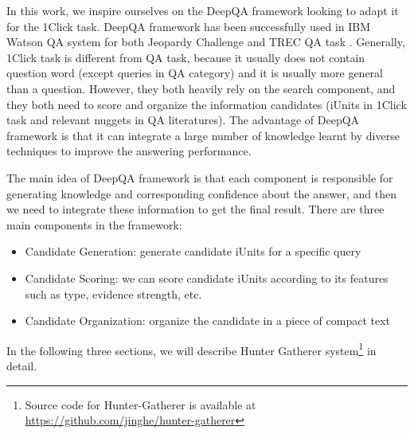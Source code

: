 In this work, we inspire ourselves on the DeepQA framework looking to adapt it for the 1Click task.
DeepQA framework has been successfully used in IBM Watson QA system for both Jeopardy Challenge and TREC QA task \cite{ferrucci_etal_AI10}.
Generally, 1Click task is different from QA task, because it usually does not contain question word (except queries in QA category) and it is usually more general than a question.
However, they both heavily rely on the search component, and they both need to score and organize the information candidates (iUnits in 1Click task and relevant nuggets in QA literatures).
The advantage of DeepQA framework is that it can integrate a large number of knowledge learnt by diverse techniques to improve the answering performance.



The main idea of DeepQA framework is that each component is responsible for generating knowledge and corresponding confidence about the answer, and then we need to integrate these information to get the final result.
There are three main components in the framework:

\begin{itemize}
\item Candidate Generation: generate candidate iUnits for a specific query
\item Candidate Scoring: we can score candidate iUnits according to its features such as type, evidence strength, etc.
\item Candidate Organization: organize the candidate in a piece of compact text
\end{itemize}


In the following three sections, we will describe Hunter Gatherer system\footnote{Source code for Hunter-Gatherer is available at \url{https://github.com/jinghe/hunter-gatherer}} in detail.


